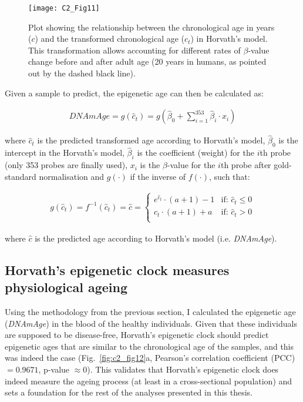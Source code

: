 \begin{enumerate}
	\begin{figure}[htbp!] 
		\centering
		\texttt{[image: C2\_Fig11]}
		\vspace*{2mm}    
		\caption[Transforming chronological age in Horvath's model]{Plot showing the relationship between the chronological age in years ($c$) and the transformed chronological age ($c_t$) in Horvath's model. This transformation allows accounting for different rates of $\beta$-value change before and after adult age (20 years in humans, as pointed out by the dashed black line).}
		\label{fig:c2_fig11}
	\end{figure} 
	
	Given a sample to predict, the epigenetic age can then be calculated as:
	
	\begin{align}
	DNAmAge = g(\hat{c}_t) = g(\hat{\beta}_0 + \sum_{i=1}^{353}\hat{\beta}_i \cdot x_i)
	\end{align}
	
	where $\hat{c}_t$ is the predicted transformed age according to Horvath's model, $\hat{\beta}_0$ is the intercept in the Horvath's model, $\hat{\beta}_i$ is the coefficient (weight) for the $i$th probe (only 353 probes are finally used), $x_i$ is the $\beta$-value for the $i$th probe after gold-standard normalisation and $g(\cdot)$ if the inverse of $f(\cdot)$, such that:
	
	\begin{align}
	g(\hat{c}_t) = f^{-1}(\hat{c}_t) = \hat{c} = 
	\begin{cases}
	e^{\hat{c}_t} \cdot (a+1) - 1 &\text{if: } \hat{c}_t \leq 0 \\
	\hat{c}_t \cdot (a+1) + a &\text{if: } \hat{c}_t > 0 \\
	\end{cases}
	\end{align} 
	
	where $\hat{c}$ is the predicted age according to Horvath's model (i.e. \textit{DNAmAge}).
	
\end{enumerate}


\smallskip


\subsection{Horvath's epigenetic clock measures physiological ageing} \label{s:2.2.2}

\smallskip

Using the methodology from the previous section, I calculated the epigenetic age (\textit{\acrshort{DNAmAge}}) in the blood of the healthy individuals. Given that these individuals are supposed to be disease-free, Horvath's epigenetic clock should predict epigenetic ages that are similar to the chronological age of the samples, and this was indeed the case (Fig.~\ref{fig:c2_fig12}a, Pearson's correlation coefficient (\acrshort{PCC}) $= 0.9671$, p-value $\approx 0$). This validates that Horvath's epigenetic clock does indeed measure the ageing process (at least in a cross-sectional population) and sets a foundation for the rest of the analyses presented in this thesis.

